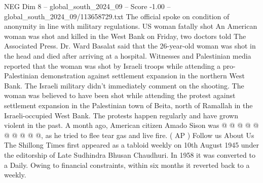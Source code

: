 \begin{textsample}{NEG Dim 8 – global\_south\_2024\_09 – Score -1.00 – global\_south\_2024\_09/113658729.txt}
The official spoke on condition of anonymity in line with military regulations.
US woman fatally shot An American woman was shot and killed in the West Bank on Friday, two doctors told The Associated Press.
Dr.
Ward Basalat said that the 26-year-old woman was shot in the head and died after arriving at a hospital.
Witnesses and Palestinian media reported that the woman was shot by Israeli troops while attending a pro-Palestinian demonstration against settlement expansion in the northern West Bank.
The Israeli military didn't immediately comment on the shooting.
The woman was believed to have been shot while attending the protest against settlement expansion in the Palestinian town of Beita, north of Ramallah in the Israeli-occupied West Bank.
The protests happen regularly and have grown violent in the past.
A month ago, American citizen Amado Sison was @ @ @ @ @ @ @ @ @ @, as he tried to flee tear gas and live fire. ( AP ) Follow us About Us The Shillong Times first appeared as a tabloid weekly on 10th August 1945 under the editorship of Late Sudhindra Bhusan Chaudhuri.
In 1958 it was converted to a Daily.
Owing to financial constraints, within six months it reverted back to a weekly.

\end{textsample}
